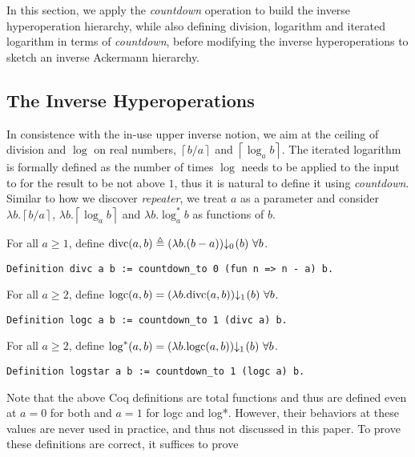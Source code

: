 In this section, we apply the \emph{countdown} operation to build the inverse hyperoperation hierarchy, while also defining division, logarithm and iterated logarithm in terms of \emph{countdown}, before modifying the inverse hyperoperations to sketch an inverse Ackermann hierarchy.

\subsection{The Inverse Hyperoperations}
In consistence with the in-use upper inverse notion, we aim at the ceiling of division and $\log$ on real numbers, $\left\lceil b/a \right\rceil$ and $\left\lceil \log_ab \right\rceil$. The iterated logarithm is formally defined as the number of times $\log$ needs to be applied to the input to for the result to be not above $1$, thus it is natural to define it using \emph{countdown}.
Similar to how we discover \emph{repeater}, we treat $a$ as a parameter and consider $\lambda b.\left\lceil b/a \right\rceil$, $\lambda b.\left\lceil \log_ab \right\rceil$ and $\lambda b. \log^*_ab$ as functions of $b$. 
\begin{defn} \label{defn: divc}
	For all $a\ge 1$, define $\divc(a, b) \triangleq \cdt{\left(\lambda b. (b-a)\right)}{0}(b) \ \forall b$.
\begin{lstlisting}
Definition divc a b := countdown_to 0 (fun n => n - a) b.
\end{lstlisting}\vspace*{-0.5\baselineskip}
\end{defn}
\begin{defn} \label{defn: logc}
	For all $a\ge 2$, define $\logc(a, b) = \cdt{\left(\lambda b. \divc(a, b)\right)}{1}(b) \ \forall b$.
\begin{lstlisting}
Definition logc a b := countdown_to 1 (divc a) b.
\end{lstlisting}\vspace*{-0.5\baselineskip}
\end{defn}
\begin{defn} \label{defn: log*}
	For all $a\ge 2$, define $\log^*(a, b) = \cdt{\left(\lambda b. \logc(a, b)\right)}{1}(b) \ \forall b$.
\begin{lstlisting}
Definition logstar a b := countdown_to 1 (logc a) b.
\end{lstlisting}\vspace*{-0.5\baselineskip}
\end{defn}
Note that the above Coq definitions are total functions and thus are defined even at $a = 0$ for both and $a = 1$ for logc and log*. However, their behaviors at these values are never used in practice, and thus not discussed in this paper. To prove these definitions are correct, it suffices to prove
